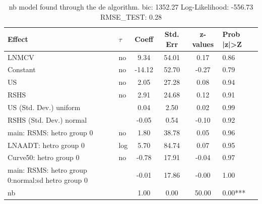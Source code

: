\begin{table}
	\caption{nb model found through the de algorithm. bic: 1352.27 Log-Likelihood: -556.73 RMSE_TEST: 0.28}
	\begin{center}
		\begin{tabular}{|l|l|c|c|c|l|}
			\hline
			Effect & $\tau$ & Coeff & Std. Err & z-values & Prob |z|>Z \\
			\hline
			LNMCV & no & 9.34 & 54.01 & 0.17 & 0.86 \\
			\hline
			Constant & no & -14.12 & 52.70 & -0.27 & 0.79 \\
			\hline
			US & no & 2.05 & 27.28 & 0.08 & 0.94 \\
			\hline
			RSHS & no & 2.91 & 24.68 & 0.12 & 0.91 \\
			\hline
			US (Std. Dev.) uniform &  & 0.04 & 2.50 & 0.02 & 0.99 \\
			\hline
			RSHS (Std. Dev.) normal &  & -0.05 & 0.54 & -0.10 & 0.92 \\
			\hline
			main: RSMS: hetro group 0 & no & 1.80 & 38.78 & 0.05 & 0.96 \\
			\hline
			LNAADT: hetro group 0 & log & 5.70 & 84.74 & 0.07 & 0.95 \\
			\hline
			Curve50: hetro group 0 & no & -0.78 & 17.91 & -0.04 & 0.97 \\
			\hline
			main: RSMS: hetro group 0:normal:sd  hetro group 0 &  & -0.01 & 17.86 & -0.00 & 1.00 \\
			\hline
			nb &  & 1.00 & 0.00 & 50.00 & 0.00*** \\
			\hline
		\end{tabular}
	\end{center}
\end{table}